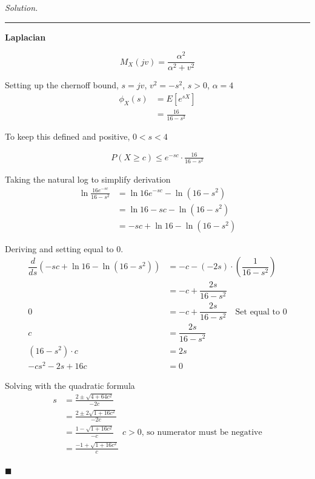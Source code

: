 \documentclass[11pt]{article}
\newenvironment{solution}
{\par\medskip\noindent\textit{Solution.}\ }
{\hfill$\blacksquare$\par\medskip}
\begin{document}
\begin{solution}
        \hrule
        \vspace{1em}

        \textbf{Laplacian}

        \[
            M_X(jv) = \frac{\alpha^2}{\alpha^2 + v^2}
        \]

        Setting up the chernoff bound, $s = jv$, $v^2 = -s^2$, $s > 0$, $\alpha = 4$
        \begin{align*}
            \phi_X(s) &= E[e^{sX}] \\
            &= \frac{16}{16 - s^2}
        \end{align*}

        To keep this defined and positive, $0 < s < 4$

        \begin{align*}
            P(X \geq c) \leq e^{-sc} \cdot \frac{16}{16 - s^2}
        \end{align*}

        Taking the natural log to simplify derivation
        \begin{align*}
            \ln{\frac{16e^{-sc}}{16 - s^2}} &= \ln{16e^{-sc}} - \ln{\left(16 - s^2\right)} \\
            &= \ln{16} - sc - \ln{\left(16 - s^2\right)} \\
            &= - sc + \ln{16} - \ln{\left(16 - s^2\right)}
        \end{align*}

        Deriving and setting equal to 0.
        \begin{align*}
            \dfrac{d}{ds} (- sc + \ln{16} - \ln{\left(16 - s^2\right)}) &= -c - \left(-2s\right) \cdot \left(\dfrac{1}{16 - s^2}\right) \\
            &= -c + \dfrac{2s}{16 - s^2} \\
            0 &= -c + \dfrac{2s}{16 - s^2} \quad \text{Set equal to 0} \\
            c &= \dfrac{2s}{16 - s^2} \\
            (16 - s^2) \cdot c &= 2s \\
            - cs^2 - 2s + 16c &= 0
        \end{align*}

        Solving with the quadratic formula
        \begin{align*}
            s &= \frac{2 \pm \sqrt{4 + 64c^2}}{-2c} \\
            &= \frac{2 \pm 2\sqrt{1 + 16c^2}}{-2c} \\
            &= \frac{1 - \sqrt{1 + 16c^2}}{-c} \quad \text{$c > 0$, so numerator must be negative} \\
            &= \frac{- 1 + \sqrt{1 + 16c^2}}{c}
        \end{align*}


\end{solution}
\end{document}
